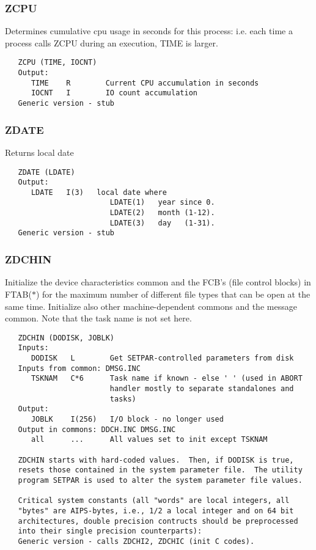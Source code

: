 \subsubsection{ZCPU}
Determines cumulative cpu usage in seconds for this process:
i.e. each time a process calls ZCPU during an execution, TIME is
larger.
\begin{verbatim}
   ZCPU (TIME, IOCNT)
   Output:
      TIME    R        Current CPU accumulation in seconds
      IOCNT   I        IO count accumulation
   Generic version - stub
\end{verbatim}

\subsubsection{ZDATE}
Returns local date
\begin{verbatim}
   ZDATE (LDATE)
   Output:
      LDATE   I(3)   local date where
                        LDATE(1)   year since 0.
                        LDATE(2)   month (1-12).
                        LDATE(3)   day   (1-31).
   Generic version - stub
\end{verbatim}

\subsubsection{ZDCHIN}
Initialize the device characteristics common and the FCB's (file
control blocks) in FTAB($\ast$) for the maximum number of different file
types that can be open at the same time.  Initialize also other
machine-dependent commons and the message common.  Note that the
task name is not set here.
\begin{verbatim}
   ZDCHIN (DODISK, JOBLK)
   Inputs:
      DODISK   L        Get SETPAR-controlled parameters from disk
   Inputs from common: DMSG.INC
      TSKNAM   C*6      Task name if known - else ' ' (used in ABORT
                        handler mostly to separate standalones and
                        tasks)
   Output:
      JOBLK    I(256)   I/O block - no longer used
   Output in commons: DDCH.INC DMSG.INC
      all      ...      All values set to init except TSKNAM

   ZDCHIN starts with hard-coded values.  Then, if DODISK is true,
   resets those contained in the system parameter file.  The utility
   program SETPAR is used to alter the system parameter file values.

   Critical system constants (all "words" are local integers, all
   "bytes" are AIPS-bytes, i.e., 1/2 a local integer and on 64 bit
   architectures, double precision contructs should be preprocessed
   into their single precision counterparts):
   Generic version - calls ZDCHI2, ZDCHIC (init C codes).
\end{verbatim}

